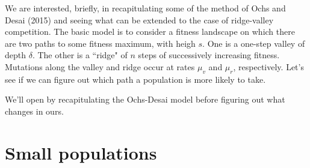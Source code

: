 \documentclass[10pt]{revtex4}
\begin{document}
We are interested, briefly, in recapitulating some of the method of Ochs and Desai (2015) and seeing what can be extended to the case of ridge-valley competition.
The basic model is to consider a fitness landscape on which there are two paths to some fitness maximum, with heigh $s$.
One is a one-step valley of depth $\delta$.
The other is a ``ridge" of $n$ steps of successively increasing fitness.
Mutations along the valley and ridge occur at rates $\mu_v$ and $\mu_r$, respectively.
Let's see if we can figure out which path a population is more likely to take.

We'll open by recapitulating the Ochs-Desai model before figuring out what changes in ours.

\section*{Small populations}
\end{document}
